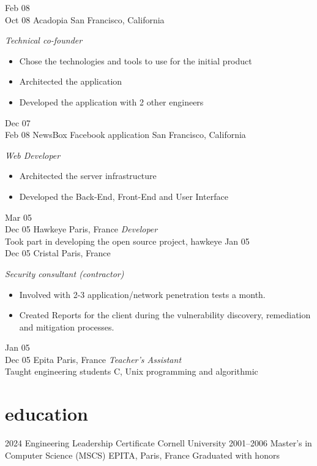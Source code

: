 \documentclass[]{cv-style}          %
\begin{document}
\begin{entrylist}
\entry
{Feb 08\\Oct 08}
{Acadopia}
{San Francisco, California}
{\emph{Technical co-founder } \\
\vspace{-10pt}\begin{itemize}
\item Chose the technologies and tools to use for the initial product
\item Architected the application
\item Developed the application with 2 other engineers
\end{itemize}}
\entry
{Dec 07\\Feb 08}
{NewsBox Facebook application}
{San Francisco, California}
{\emph{Web Developer} \\
\vspace{-10pt}\begin{itemize}
\item Architected the server infrastructure
\item Developed the Back-End, Front-End and User Interface
\end{itemize}}
\entry
{Mar 05\\Dec 05}
{Hawkeye}
{Paris, France}
{\emph{Developer} \\
Took part in developing the open source project, hawkeye}
\entry
{Jan 05\\Dec 05}
{Cristal}
{Paris, France}
{\emph{Security consultant (contractor)} \\
\vspace{-10pt}\begin{itemize}
\item Involved with 2-3 application/network penetration tests a month.
\item Created Reports for the client during the vulnerability discovery, remediation and mitigation processes.
\end{itemize}}
\entry
{Jan 05\\Dec 05}
{Epita}
{Paris, France}
{\emph{Teacher’s Assistant} \\
Taught engineering students C, Unix programming and algorithmic}


\end{entrylist}

\section{education}

\begin{entrylist}
\entry
{2024}
{Engineering Leadership Certificate}
{Cornell University}
{}
\entry
{2001--2006}
{Master's {\normalfont in Computer Science (MSCS)}}
{EPITA, Paris, France}
{Graduated with honors}
\end{entrylist}
\end{document}
